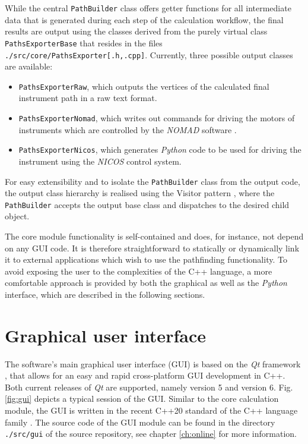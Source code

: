 While the central \lstinline[language=C++]|PathBuilder| class offers getter functions for all intermediate
data that is generated during each step of the calculation workflow, the final results are output using
the classes derived from the purely virtual class \lstinline[language=C++]|PathsExporterBase| that resides
in the files \lstinline|./src/core/PathsExporter[.h,.cpp]|. Currently, three possible output classes
are available:
\begin{itemize}
	\item \lstinline[language=C++]|PathsExporterRaw|, which outputs the vertices of the calculated 
		final instrument path in a raw text format.
	\item \lstinline[language=C++]|PathsExporterNomad|, which writes out commands for driving the
		motors of instruments which are controlled by the \textit{NOMAD} software \cite{web_NOMAD}.
	\item \lstinline[language=C++]|PathsExporterNicos|, which generates \textit{Python} code to
		be used for driving the instrument using the \textit{NICOS} \cite{web_NICOS} control system.
\end{itemize}
For easy extensibility and to isolate the \lstinline[language=C++]|PathBuilder| class from the output
code, the output class hierarchy is realised using the Visitor pattern \cite{wiki_visitor} 
\cite[Ch. 4, pp. 141-147]{FUH_prog2019}, where the \lstinline[language=C++]|PathBuilder| 
accepts the output base class and dispatches to the desired child object.

The core module functionality is self-contained and does, for instance, not depend on any GUI code.
It is therefore straightforward to statically or dynamically link it to external applications which 
wish to use the pathfinding functionality. To avoid exposing the user to the complexities of
the C++ language, a more comfortable approach is provided by both the graphical as well 
as the \textit{Python} interface, which are described in the following sections.



\section{Graphical user interface}
\label{sec:gui}
The software's main graphical user interface (GUI) is based on the \textit{Qt} framework 
\cite{web_Qt}, that allows for an easy and rapid cross-platform GUI development in C++. 
Both current releases of \textit{Qt} are supported, namely version 5 and version 6.
Fig. \ref{fig:gui} depicts a typical session of the GUI.
Similar to the core calculation module, the GUI is written in the recent C++20
standard \cite{ISOCPP20} of the C++ language family \cite{Stroustrup2008, Stroustrup2018}.
The source code of the GUI module can be found in the directory \lstinline|./src/gui| of the
source repository, see chapter \ref{ch:online} for more information.

